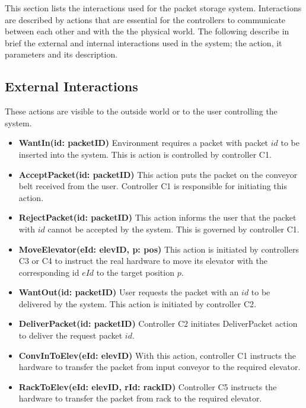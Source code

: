\label{sec:ext_interactions}
This section lists the interactions used for the packet storage system. Interactions are described by actions that are essential for the controllers to communicate between each other and with the the physical world. The following describe in brief the external and internal interactions used in the system; the action, it parameters and its description.

\subsection*{External Interactions} These actions are visible to the outside world or to the user controlling the system.

\begin{itemize}
\item \textbf{WantIn(id: packetID)}
Environment requires a packet with packet $id$ to be inserted into the system. This is action is controlled by controller C1.

\item \textbf{AcceptPacket(id: packetID)}
This action puts the packet on the conveyor belt received from the user. Controller C1 is responsible for initiating this action.

\item \textbf{RejectPacket(id: packetID)}
This action informs the user that the packet with $id$ cannot be accepted by the system. This is governed by controller C1.

\item \textbf{MoveElevator(eId: elevID, p: pos)}
This action is initiated by controllers C3 or C4 to instruct the real hardware to move its elevator with the corresponding id $eId$ to the target position $p$.

\item \textbf{WantOut(id: packetID)}
User requests the packet with an $id$ to be delivered by the system. This action is initiated by controller C2.

\item \textbf{DeliverPacket(id: packetID)}
Controller C2 initiates DeliverPacket action to deliver the request packet $id$.

\item \textbf{ConvInToElev(eId: elevID)}
With this action, controller C1 instructs the hardware to transfer the packet from input conveyor to the required elevator.

\item \textbf{RackToElev(eId: elevID, rId: rackID)}
Controller C5 instructs the hardware to transfer the packet from rack to the required elevator.


\end{itemize}

